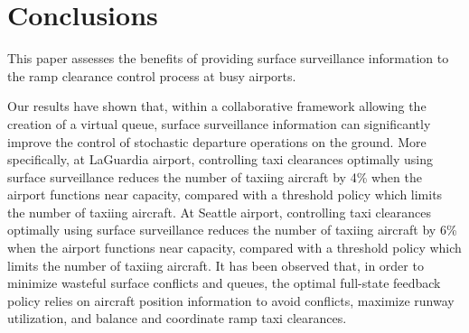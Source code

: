 \documentclass[letterpaper]{article}
\begin{document}
\section{Conclusions}
This paper assesses the benefits of providing surface surveillance information to the ramp clearance control
process at busy airports.

Our results have shown that, within a collaborative framework allowing the creation of a virtual queue, surface surveillance information can significantly improve the control of stochastic 
departure operations on the ground. More specifically, at LaGuardia airport, controlling taxi clearances optimally using surface surveillance reduces
 the number of taxiing aircraft by 4\% when the airport functions near capacity, compared with a threshold policy which limits the number of taxiing 
 aircraft. At Seattle airport, controlling taxi clearances optimally using surface surveillance reduces the number
of taxiing aircraft by 6\% when the airport functions near capacity, compared with a threshold policy which limits the number of taxiing aircraft.
It has been observed that, in order to minimize wasteful surface conflicts and queues, the optimal full-state feedback policy relies on aircraft position information to avoid conflicts, maximize runway utilization, and balance and coordinate ramp taxi clearances. 
\end{document}
